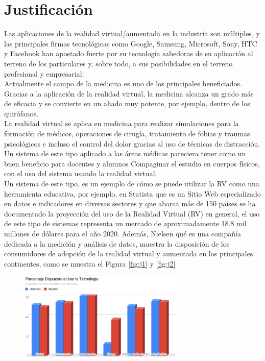 \section{Justificación}
Las aplicaciones de la realidad virtual/aumentada en la industria son múltiples, y las principales firmas tecnológicas como Google, Samsung, Microsoft, 
Sony, HTC y Facebook han apostado fuerte por su tecnología sabedoras de su aplicación al terreno de los particulares y, sobre todo, a sus posibilidades 
en el terreno profesional y empresarial.\\
Actualmente el campo de la medicina es uno de los principales beneficiados. Gracias a la aplicación de la realidad virtual, la medicina alcanza un grado más de eficacia 
y se convierte en un aliado muy potente, por ejemplo, dentro de los quirófanos.\\
La realidad virtual se aplica en medicina para realizar simulaciones para la formación de médicos, operaciones de cirugía, tratamiento de fobias y traumas 
psicológicos e incluso el control del dolor gracias al uso de técnicas de distracción.\\
Un sistema de este tipo aplicado a las áreas médicas pareciera tener como un buen beneficio para docentes y alumnos Compaginar el estudio en cuerpos físicos, con 
el uso del sistema usando la realidad virtual\cite{norton1994integrating}.\\
Un sistema de este tipo, es un ejemplo de cómo se puede utilizar la RV como una herramienta educativa, por ejemplo,  en Statista\cite{web1} que es un Sitio Web especializado 
en datos e indicadores en diversas sectores y que abarca más de 150 países se ha documentado la proyección del uso de la Realidad Virtual (RV) en general, el 
uso de este tipo de sistemas  representa un mercado de aproximadamente 18.8 mil millones de dólares para el año 2020. Además, Nielsen\cite{web2} qué es una compañía dedicada 
a la medición y análisis de datos,  muestra la disposición de los consumidores de adopción de la realidad virtual y aumentada en los principales continentes, como se muestra el Figura \ref{fig:j1} y \ref{fig:j2}
\begin{figure}[H]
	\begin{center}
 		\includegraphics[width = 0.7\textwidth]{v3/images/chart2.png}
	\end{center} 
\end{figure}

